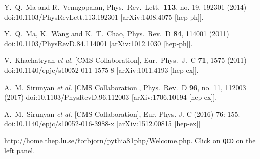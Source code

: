 \documentclass[12pt]{article}
\begin{document}
\begin{thebibliography}{1}
  Y.~Q.~Ma and R.~Venugopalan,
  Phys.\ Rev.\ Lett.\  {\bf 113}, no. 19, 192301 (2014)
  doi:10.1103/PhysRevLett.113.192301
  [arXiv:1408.4075 [hep-ph]].

  
  Y.~Q.~Ma, K.~Wang and K.~T.~Chao,
  Phys.\ Rev.\ D {\bf 84}, 114001 (2011)
  doi:10.1103/PhysRevD.84.114001
  [arXiv:1012.1030 [hep-ph]].

  V.~Khachatryan {\it et al.} [CMS Collaboration],
  Eur.\ Phys.\ J.\ C {\bf 71}, 1575 (2011)
  doi:10.1140/epjc/s10052-011-1575-8
  [arXiv:1011.4193 [hep-ex]].

  
  A.~M.~Sirunyan {\it et al.} [CMS Collaboration],
  Phys.\ Rev.\ D {\bf 96}, no. 11, 112003 (2017)
  doi:10.1103/PhysRevD.96.112003
  [arXiv:1706.10194 [hep-ex]].

  A.~M.~Sirunyan {\it et al.} [CMS Collaboration],
  Eur. Phys. J. C (2016) 76: 155.
  doi:10.1140/epjc/s10052-016-3988-x
  [arXiv:1512.00815 [hep-ex]]
   
\href{http://home.thep.lu.se/\~torbjorn/pythia81php/Welcome.php}
{http://home.thep.lu.se/\~torbjorn/pythia81php/Welcome.php}.  Click on 
{\tt QCD} on the left panel.



  
\end{thebibliography}
  
\end{document}
